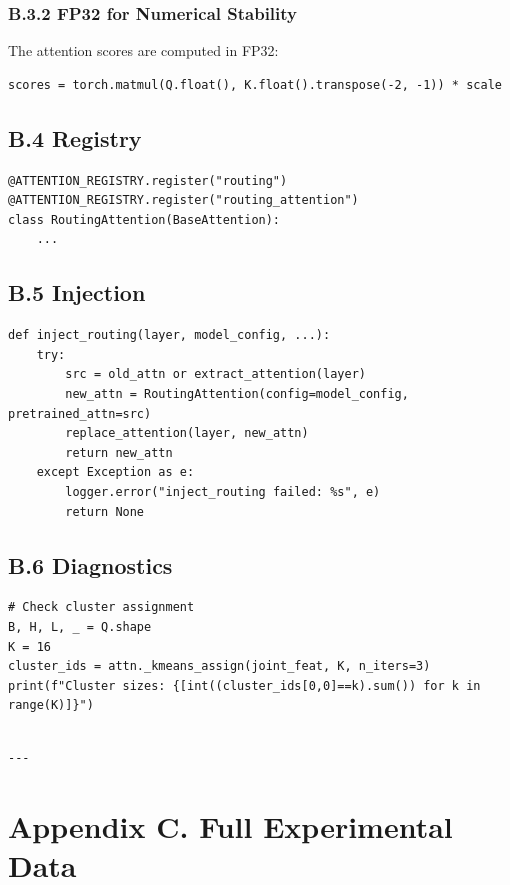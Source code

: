 \subsubsection{B.3.2 FP32 for Numerical Stability}

The attention scores are computed in FP32:

\begin{lstlisting}
scores = torch.matmul(Q.float(), K.float().transpose(-2, -1)) * scale
\end{lstlisting}

\subsection{B.4 Registry}

\begin{lstlisting}
@ATTENTION_REGISTRY.register("routing")
@ATTENTION_REGISTRY.register("routing_attention")
class RoutingAttention(BaseAttention):
    ...
\end{lstlisting}

\subsection{B.5 Injection}

\begin{lstlisting}
def inject_routing(layer, model_config, ...):
    try:
        src = old_attn or extract_attention(layer)
        new_attn = RoutingAttention(config=model_config, pretrained_attn=src)
        replace_attention(layer, new_attn)
        return new_attn
    except Exception as e:
        logger.error("inject_routing failed: %s", e)
        return None
\end{lstlisting}

\subsection{B.6 Diagnostics}

\begin{lstlisting}
# Check cluster assignment
B, H, L, _ = Q.shape
K = 16
cluster_ids = attn._kmeans_assign(joint_feat, K, n_iters=3)
print(f"Cluster sizes: {[int((cluster_ids[0,0]==k).sum()) for k in range(K)]}")
\end{lstlisting}
\begin{lstlisting}

---
\end{lstlisting}


\section{Appendix C. Full Experimental Data}

